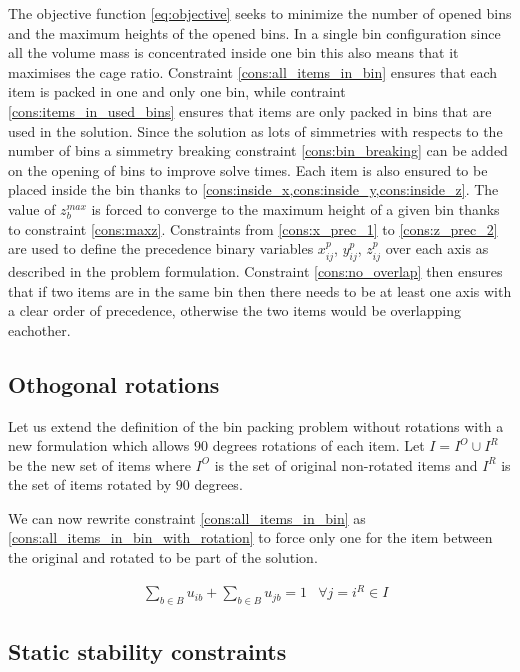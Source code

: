 The objective function \ref{eq:objective} seeks to minimize the number of opened bins and the maximum heights of the opened bins. In a single bin configuration since all the volume mass is concentrated inside one bin this also means that it maximises the cage ratio.
Constraint \ref{cons:all_items_in_bin} ensures that each item is packed in one and only one bin, while contraint \ref{cons:items_in_used_bins} ensures that items are only packed in bins that are used in the solution.
Since the solution as lots of simmetries with respects to the number of bins a simmetry breaking constraint \ref{cons:bin_breaking} can be added on the opening of bins to improve solve times.
Each item is also ensured to be placed inside the bin thanks to \cref{cons:inside_x,cons:inside_y,cons:inside_z}.
The value of $z^{max}_b$ is forced to converge to the maximum height of a given bin thanks to constraint \ref{cons:maxz}.
Constraints from \ref{cons:x_prec_1} to \ref{cons:z_prec_2} are used to define the precedence binary variables $x^p_{ij}$, $y^p_{ij}$, $z^p_{ij}$ over each axis as described in the problem formulation.
Constraint \ref{cons:no_overlap} then ensures that if two items are in the same bin then there needs to be at least one axis with a clear order of precedence, otherwise the two items would be overlapping eachother.
\subsection*{Othogonal rotations}

Let us extend the definition of the bin packing problem without rotations with a new formulation which allows $90$ degrees rotations of each item.
Let $I = I^O \cup I^R$ be the new set of items where $I^O$ is the set of original non-rotated items and $I^R$ is the set of items rotated by $90$ degrees.

We can now rewrite constraint \ref{cons:all_items_in_bin} as \ref{cons:all_items_in_bin_with_rotation} to force only one for the item between the original and rotated to be part of the solution.

\begin{align}
    & \sum\limits_{b \in B} u_{ib} + \sum\limits_{b \in B} u_{jb} = 1 & \forall j = i^R \in I \label{cons:all_items_in_bin_with_rotation}
\end{align}

\subsection*{Static stability constraints}

